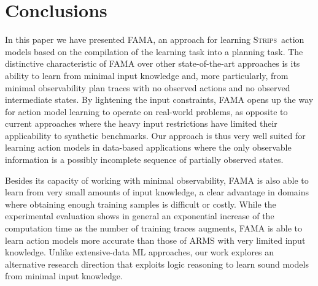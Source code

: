 \documentclass[3p,times]{elsarticle}
\newcommand{\strips}{\textsc{Strips}}     %
\newcommand{\ARMS}{{\small {\sffamily ARMS}}\xspace}
\newcommand{\FAMA}{{\small {\sffamily FAMA}}\xspace}
\begin{document}














\section{Conclusions}
\label{sec:conclusions}


In this paper we have presented \FAMA, an approach for learning \strips\ action models based on the compilation of the learning task into a planning task. The distinctive characteristic of \FAMA over other state-of-the-art approaches is its ability to learn from minimal input knowledge and, more particularly, from minimal observability plan traces with no observed actions and no observed intermediate states. By lightening the input constraints, \FAMA opens up the way for action model learning to operate on real-world problems, as opposite to current approaches where the heavy input restrictions have limited their applicability to synthetic benchmarks. Our approach is thus very well suited for learning action models in data-based applications where the only observable information is a possibly incomplete sequence of partially observed states.

Besides its capacity of working with minimal observability, \FAMA is also able to learn from very small amounts of input knowledge, a clear advantage in domains where obtaining enough training samples is difficult or costly. While the experimental evaluation shows in general an exponential increase of the computation time as the number of training traces augments, \FAMA is able to learn action models more accurate than those of \ARMS with very limited input knowledge. Unlike extensive-data ML approaches, our work explores an alternative research direction that exploits logic reasoning to learn sound models from minimal input knowledge.
\end{document}
